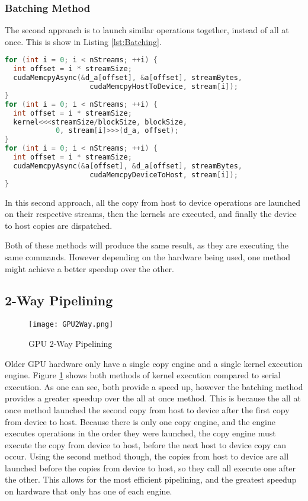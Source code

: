 \subsubsection{Batching Method}
The second approach is to launch similar operations together, instead of all at once. This is show in Listing \ref{lst:Batching}.
\begin{lstlisting}[language=C++,caption={Operations batched},label={lst:Batching}]
for (int i = 0; i < nStreams; ++i) {
  int offset = i * streamSize;
  cudaMemcpyAsync(&d_a[offset], &a[offset], streamBytes, 
                    cudaMemcpyHostToDevice, stream[i]);
}
for (int i = 0; i < nStreams; ++i) {
  int offset = i * streamSize;
  kernel<<<streamSize/blockSize, blockSize, 
            0, stream[i]>>>(d_a, offset);
}
for (int i = 0; i < nStreams; ++i) {
  int offset = i * streamSize;
  cudaMemcpyAsync(&a[offset], &d_a[offset], streamBytes, 
                    cudaMemcpyDeviceToHost, stream[i]);
}
\end{lstlisting}
In this second approach, all the copy from host to device operations are launched on their respective streams, then the kernels are executed, and finally the device to host copies are dispatched.

Both of these methods will produce the same result, as they are executing the same commands. However depending on the hardware being used, one method might achieve a better speedup over the other.

\subsection{2-Way Pipelining}
\begin{figure}[t!]
\centering
\texttt{[image: GPU2Way.png]}
\caption{GPU 2-Way Pipelining}
\label{fig:GPU2Way}
\end{figure}
Older GPU hardware only have a single copy engine and a single kernel execution engine. Figure \ref{fig:GPU2Way} shows both methods of kernel execution compared to serial execution. As one can see, both provide a speed up, however the batching method provides a greater speedup over the all at once method. This is because the all at once method launched the second copy from host to device after the first copy from device to host. Because there is only one copy engine, and the engine executes operations in the order they were launched, the copy engine must execute the copy from device to host, before the next host to device copy can occur. Using the second method though, the copies from host to device are all launched before the copies from device to host, so they call all execute one after the other. This allows for the most efficient pipelining, and the greatest speedup on hardware that only has one of each engine.
